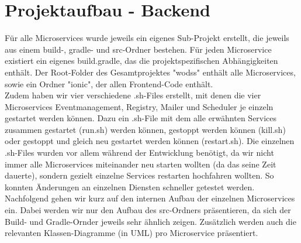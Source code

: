 \documentclass[11pt]{article} %
\begin{document}
\section{Projektaufbau - Backend}
Für alle Microservices wurde jeweils ein eigenes Sub-Projekt erstellt, die jeweils aus einem build-, gradle- und src-Ordner bestehen. Für jeden Microservice existiert ein eigenes build.gradle, das die projektspezifischen Abhängigkeiten enthält.
Der Root-Folder des Gesamtprojektes "wodss" enthält alle Microservices, sowie ein Ordner "ionic", der allen Frontend-Code enthält.
\\
Zudem haben wir vier verschiedene .sh-Files erstellt, mit denen die vier Microservices Eventmanagement, Registry, Mailer und Scheduler je einzeln gestartet werden können. Dazu ein .sh-File mit dem alle erwähnten Services zusammen gestartet (run.sh) werden können, gestoppt werden können (kill.sh) oder gestoppt und gleich neu gestartet werden können (restart.sh). Die einzelnen .sh-Files wurden vor allem während der Entwicklung benötigt, da wir nicht immer alle Microservices miteinander neu starten wollten (da das seine Zeit dauerte), sondern gezielt einzelne Services restarten hochfahren wollten. So konnten Änderungen an einzelnen Diensten schneller getestet werden.
\\
Nachfolgend gehen wir kurz auf den internen Aufbau der einzelnen Microservices ein. Dabei werden wir nur den Aufbau des src-Ordners präsentieren, da sich der Build- und Gradle-Ornder jeweils sehr ähnlich zeigen. Zusätzlich werden auch die relevanten Klassen-Diagramme (in UML) pro Microservice präsentiert.
\end{document}
